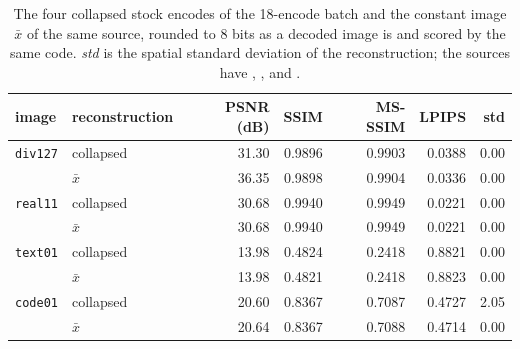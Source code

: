\begin{table}[t]
\centering
\caption{\label{tab:metrics}%
The four collapsed stock encodes of the 18-encode batch and the constant image $\bar x$ of
the same source, rounded to 8 bits as a decoded image is and scored by the same code.
\textit{std} is the spatial standard deviation of the reconstruction; the sources have
, ,  and .}
\small
\begin{tabular}{llrrrrr}
\toprule
image & reconstruction & PSNR (dB) & SSIM & MS-SSIM & LPIPS & std \\
\midrule
\texttt{div127} & collapsed & 31.30 & 0.9896 & 0.9903 & 0.0388 & 0.00 \\
 & $\bar x$ & 36.35 & 0.9898 & 0.9904 & 0.0336 & 0.00 \\
\midrule
\texttt{real11} & collapsed & 30.68 & 0.9940 & 0.9949 & 0.0221 & 0.00 \\
 & $\bar x$ & 30.68 & 0.9940 & 0.9949 & 0.0221 & 0.00 \\
\midrule
\texttt{text01} & collapsed & 13.98 & 0.4824 & 0.2418 & 0.8821 & 0.00 \\
 & $\bar x$ & 13.98 & 0.4821 & 0.2418 & 0.8823 & 0.00 \\
\midrule
\texttt{code01} & collapsed & 20.60 & 0.8367 & 0.7087 & 0.4727 & 2.05 \\
 & $\bar x$ & 20.64 & 0.8367 & 0.7088 & 0.4714 & 0.00 \\
\bottomrule
\end{tabular}
\end{table}
